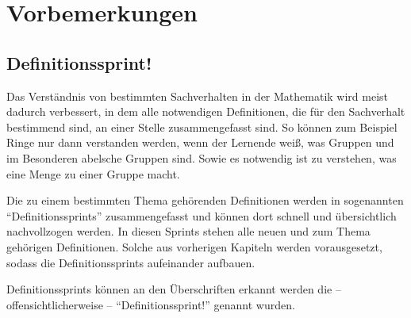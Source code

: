 \chapter{Vorbemerkungen}

\section{Definitionssprint!}

Das Verständnis von bestimmten Sachverhalten in der Mathematik wird meist dadurch verbessert, in dem alle notwendigen Definitionen, die für den Sachverhalt bestimmend sind, an einer Stelle zusammengefasst sind. So können zum Beispiel Ringe nur dann verstanden werden, wenn der Lernende weiß, was Gruppen und im Besonderen abelsche Gruppen sind. Sowie es notwendig ist zu verstehen, was eine Menge zu einer Gruppe macht. 

Die zu einem bestimmten Thema gehörenden Definitionen werden in sogenannten "`Definitionssprints"' zusammengefasst und können dort schnell und übersichtlich nachvollzogen werden. In diesen Sprints stehen alle neuen und zum Thema gehörigen Definitionen. Solche aus vorherigen Kapiteln werden vorausgesetzt, sodass die Definitionssprints aufeinander aufbauen.

Definitionssprints können an den Überschriften erkannt werden die -- offensichtlicherweise -- "`Definitionssprint!"' genannt wurden.

